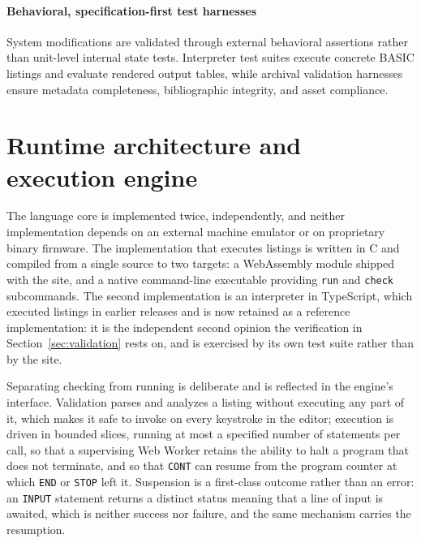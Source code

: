 \documentclass[3p,times,authoryear,twocolumn]{elsarticle}
\begin{document}
\paragraph{Behavioral, specification-first test harnesses} System modifications are validated through external behavioral assertions rather than unit-level internal state tests. Interpreter test suites execute concrete BASIC listings and evaluate rendered output tables, while archival validation harnesses ensure metadata completeness, bibliographic integrity, and asset compliance.

\section{Runtime architecture and execution engine}
\label{sec:implementation}

The language core is implemented twice, independently, and neither implementation depends on an external machine emulator or on proprietary binary firmware. The implementation that executes listings is written in C and compiled from a single source to two targets: a WebAssembly module shipped with the site, and a native command-line executable providing \texttt{run} and \texttt{check} subcommands. The second implementation is an interpreter in TypeScript, which executed listings in earlier releases and is now retained as a reference implementation: it is the independent second opinion the verification in Section~\ref{sec:validation} rests on, and is exercised by its own test suite rather than by the site.

Separating checking from running is deliberate and is reflected in the engine's interface. Validation parses and analyzes a listing without executing any part of it, which makes it safe to invoke on every keystroke in the editor; execution is driven in bounded slices, running at most a specified number of statements per call, so that a supervising Web Worker retains the ability to halt a program that does not terminate, and so that \texttt{CONT} can resume from the program counter at which \texttt{END} or \texttt{STOP} left it. Suspension is a first-class outcome rather than an error: an \texttt{INPUT} statement returns a distinct status meaning that a line of input is awaited, which is neither success nor failure, and the same mechanism carries the resumption.
\end{document}
